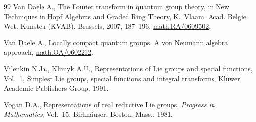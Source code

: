 \documentclass[pdftex]{sigma}
\numberwithin{equation}{section}
\theoremstyle{definition}
\begin{document}
\begin{thebibliography}{99}
  Van Daele A.,
  The Fourier transform in quantum group theory,
  in New Techniques in Hopf Algebras and Graded Ring Theory,   K.~Vlaam. Acad. Belgie Wet. Kunsten (KVAB), Brussels, 2007, 187--196,
\href{http://arxiv.org/abs/math.RA/0609502}{math.RA/0609502}.


 Van Daele  A.,
  Locally compact quantum groups. A von Neumann algebra approach,
\href{http://arxiv.org/abs/math.OA/06022121}{math.OA/0602212}.

  Vilenkin N.Ja., Klimyk A.U.,
  Representations of Lie groups and special functions, Vol.~1, Simplest Lie groups, special functions and integral transforms,
  Kluwer Academic Publishers Group, 1991.

  Vogan D.A.,
   Representations of real reductive Lie groups,
{\it Progress in Mathematics}, Vol.~15, Birkh\"auser, Boston, Mass., 1981.

\end{thebibliography}\LastPageEnding
\end{document}
